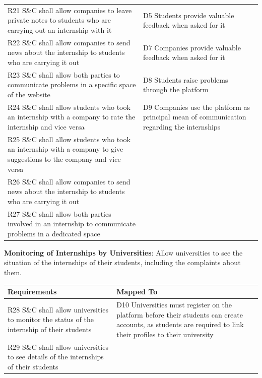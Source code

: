 \begin{enumerate}[label={[G\arabic*]}]
\begin{longtable}{|p{8cm}|p{8cm}|}
\hline
\endlastfoot
R21 S\&C shall allow companies to leave private notes to students who are carrying out an internship with it & D5 Students provide valuable feedback when asked for it \\
R22 S\&C shall allow companies to send news about the internship to students who are carrying it out & D7 Companies provide valuable feedback when asked for it \\
R23 S\&C shall allow both parties to communicate problems in a specific space of the website & D8 Students raise problems through the platform\\
R24 S\&C shall allow students who took an internship with a company to rate the internship and vice versa & D9 Companies use the platform as principal mean of communication regarding the internships \\
R25 S\&C shall allow students who took an internship with a company to give suggestions to the company and vice versa & \\
R26 S\&C shall allow companies to send news about the internship to students who are carrying it out & \\
R27 S\&C shall allow both parties involved in an internship to communicate problems in a dedicated space & \\


\end{longtable}

\item \textbf{Monitoring of Internships by Universities}: 
    Allow universities to see the situation of the internships of their students, including the complaints about them.

\begin{longtable}{|p{8cm}|p{8cm}|}
\hline
\rowcolor[HTML]{CFE2F3} 
\textbf{Requirements} & \textbf{Mapped To} \\
\hline
\endfirsthead

\hline
\endfoot

\hline
\endlastfoot
R28 S\&C shall allow universities to monitor the status of the internship of their students & D10 Universities must register on the platform before their students can create accounts, as students are required to link their profiles to their university \\ 
R29 S\&C shall allow universities to see details of the internships of their students & \\

\end{longtable}
\end{enumerate}
            
